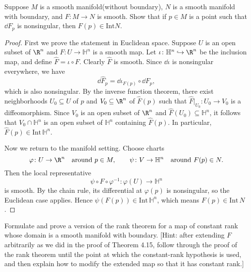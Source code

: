 \begin{problem}
    Suppose $M$ is a smooth manifold(without boundary), $N$ is a smooth manifold with boundary, and $F \colon M \to N$ is smooth. Show that if $p\in M$ is a point such that $\dd{F}_p$ is nonsingular, then $F(p) \in \mathrm{Int}N$.
\begin{proof}
First we prove the statement in Euclidean space. Suppose $U$ is an open subset of $\R^n$ and 
$F \colon U \to \mathbb{H}^n$ is a smooth map. Let $\iota \colon \mathbb{H}^n \hookrightarrow \R^n$ 
be the inclusion map, and define $\widehat{F} = \iota \circ F$. Clearly $\widehat{F}$ is smooth. 
Since $\dd{\iota}$ is nonsingular everywhere, we have 
\[
\dd{\widehat{F}}_p = \dd{\iota}_{F(p)} \circ \dd{F}_p,
\] 
which is also nonsingular. By the inverse function theorem, there exist neighborhoods 
$U_0 \subseteq U$ of $p$ and $V_0 \subseteq \R^n$ of $\widehat{F}(p)$ such that 
$\widehat{F}|_{U_0} \colon U_0 \to V_0$ is a diffeomorphism. Since $V_0$ is an open subset of 
$\R^n$ and $\widehat{F}(U_0) \subseteq \mathbb{H}^n$, it follows that $V_0 \cap \mathbb{H}^n$ 
is an open subset of $\mathbb{H}^n$ containing $\widehat{F}(p)$. In particular, 
$\widehat{F}(p) \in \mathrm{Int}\,\mathbb{H}^n$.

Now we return to the manifold setting. Choose charts 
\[
\varphi \colon U \to \R^n \quad \text{around } p \in M,
\qquad 
\psi \colon V \to \mathbb{H}^n \quad \text{around } F(p) \in N.
\]
Then the local representative 
\[
\psi \circ F \circ \varphi^{-1} \colon \varphi(U) \to \mathbb{H}^n
\]
is smooth. By the chain rule, its differential at $\varphi(p)$ is nonsingular, so the Euclidean case applies. Hence 
$\psi(F(p)) \in \mathrm{Int}\,\mathbb{H}^n$, which means $F(p) \in \mathrm{Int}\,N$.
\end{proof}

\end{problem}

\begin{problem}
    Formulate and prove a version of the rank theorem for a map of constant rank
    whose domain is a smooth manifold with boundary. [Hint: after extending $F$
    arbitrarily as we did in the proof of Theorem 4.15, follow through the proof
    of the rank theorem until the point at which the constant-rank hypothesis
    is used, and then explain how to modify the extended map so that it has
    constant rank.]
\end{problem}


